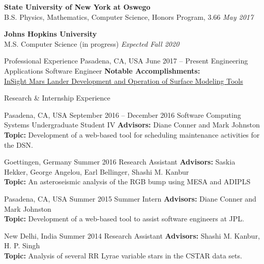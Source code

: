 \documentclass{resume} %
\begin{document}
\textbf{State University of New York at Oswego}
\\
B.S. Physics, Mathematics, Computer Science, Honors Program, 3.66
\hfill
\emph{May 2017}

\textbf{Johns Hopkins University}
\\
M.S. Computer Science (in progress)
\hfill
\emph{Expected Fall 2020}

\begin{rSection}{Professional Experience}{}
           {Pasadena, CA, USA}
           {June 2017 -- Present}
           {Engineering Applications Software Engineer}
           {
        \textbf{Notable Accomplishments:}\\
        \href{http://www.oswegocountynewsnow.com/news/mars-landing-puts-phoenix-native-suny-oswego-grad-roffo-among/article_968bd574-f34c-11e8-8c5b-b7d557e9f682.html?fbclid=IwAR1iCW3CdQIRr2JIy1f96utXjzzidSJ6vA13jVgvkjKIU6PopaLHYkpbQrw}{InSight Mars Lander Development and Operation of Surface Modeling Tools}
    }
\end{rSection}

\begin{rSection}{Research \& Internship Experience}{}

           {Pasadena, CA, USA}
           {September 2016 -- December 2016}
           {Software Computing Systems Undergraduate Student IV}
           {
    \textbf{Advisors:}
    Diane Conner and Mark Johnston
    \\
    \textbf{Topic:}
    Development of a web-based tool for scheduling maintenance activities for the DSN.
  }

           {Goettingen, Germany}
           {Summer 2016}
           {Research Assistant}
           {
    \textbf{Advisors:}
    Saskia Hekker, George Angelou, Earl Bellinger, Shashi M. Kanbur
    \\
    \textbf{Topic:}
    An asteroseismic analysis of the RGB bump using MESA and ADIPLS
  }

           {Pasadena, CA, USA}
           {Summer 2015}
           {Summer Intern}
           {
    \textbf{Advisors:}
    Diane Conner and Mark Johnston
    \\
    \textbf{Topic:}
    Development of a web-based tool to assist software engineers at JPL.
  }

           {New Delhi, India}
           {Summer 2014}
           {Research Assistant}
           {
    \textbf{Advisors:}
    Shashi M. Kanbur, H. P. Singh
    \\
    \textbf{Topic:}
    Analysis of several RR Lyrae variable stars in the CSTAR data sets.
  }

\end{rSection}
\end{document}
